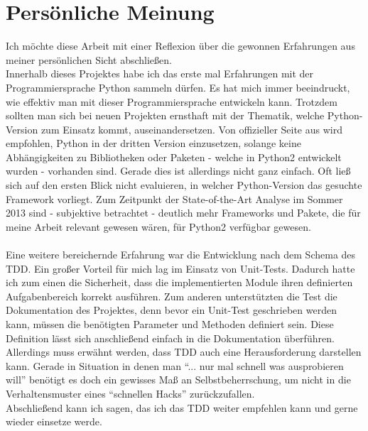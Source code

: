 \documentclass[Bachelorarbeit.tex]{subfiles}
\begin{document}
\section{Persönliche Meinung}
Ich möchte diese Arbeit mit einer Reflexion über die gewonnen Erfahrungen aus meiner persönlichen Sicht abschließen. \\
Innerhalb dieses Projektes habe ich das erste mal Erfahrungen mit der Programmiersprache Python sammeln dürfen. 
Es hat mich immer beeindruckt, wie effektiv man mit dieser Programmiersprache entwickeln kann. 
Trotzdem sollten man sich bei neuen Projekten ernsthaft mit der Thematik, welche Python-Version zum Einsatz kommt, auseinandersetzen. 
Von offizieller Seite aus wird empfohlen, Python in der dritten Version einzusetzen, solange keine Abhängigkeiten zu Bibliotheken oder Paketen - welche in Python2 entwickelt wurden - vorhanden sind. \parencite[vgl.][]{python2_or_python3} 
Gerade dies ist allerdings nicht ganz einfach. 
Oft ließ sich auf den ersten Blick nicht evaluieren, in welcher Python-Version das gesuchte Framework vorliegt. 
Zum Zeitpunkt der State-of-the-Art Analyse im Sommer 2013 sind - subjektive betrachtet - deutlich mehr Frameworks und Pakete, die  für meine Arbeit relevant gewesen wären, für Python2 verfügbar gewesen. \\
\\
Eine weitere bereichernde Erfahrung war die Entwicklung nach dem Schema des \ac{TDD}. 
Ein großer Vorteil für mich lag im Einsatz von Unit-Tests. 
Dadurch hatte ich zum einen die Sicherheit, dass die implementierten Module ihren definierten Aufgabenbereich korrekt ausführen.
Zum anderen unterstützten die Test die Dokumentation des Projektes, denn bevor ein Unit-Test geschrieben werden kann, müssen die benötigten Parameter und Methoden definiert sein. 
Diese Definition lässt sich anschließend einfach in die Dokumentation überführen.\\
Allerdings muss erwähnt werden, dass \ac{TDD} auch eine Herausforderung darstellen kann.
Gerade in Situation in denen man "`... nur mal schnell  was ausprobieren will"'  benötigt es doch ein gewisses Maß an Selbstbeherrschung, um nicht in die Verhaltensmuster eines "`schnellen Hacks"' zurückzufallen.\\
Abschließend kann ich sagen, das ich das \ac{TDD} weiter empfehlen kann und gerne wieder einsetze werde.
\end{document}
